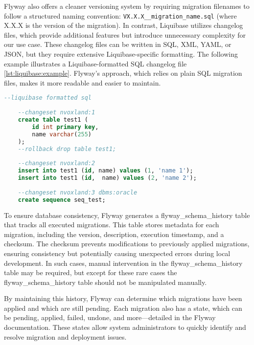 Flyway also offers a cleaner versioning system by requiring migration filenames to follow a structured naming convention: \texttt{VX.X.X\_\_migration\_name.sql} (where X.X.X is the version of the migration). In contrast, Liquibase utilizes changelog files, which provide additional features but introduce unnecessary complexity for our use case. These changelog files can be written in SQL, XML, YAML, or JSON, but they require extensive Liquibase-specific formatting. The following example illustrates a Liquibase-formatted SQL changelog file \ref{lst:liquibase:example}. Flyway's approach, which relies on plain SQL migration files, makes it more readable and easier to maintain.

\begin{lstlisting}[language=Sql,caption=Liquibase example changelog,label=lst:liquibase:example]
    --liquibase formatted sql
    
    --changeset nvoxland:1
    create table test1 (  
        id int primary key,
        name varchar(255)  
    );  
    --rollback drop table test1; 
    
    --changeset nvoxland:2 
    insert into test1 (id, name) values (1, 'name 1');
    insert into test1 (id,  name) values (2, 'name 2');  
    
    --changeset nvoxland:3 dbms:oracle
    create sequence seq_test;
\end{lstlisting}
    
To ensure database consistency, Flyway generates a flyway\_schema\_history table that tracks all executed migrations. This table stores metadata for each migration, including the version, description, execution timestamp, and a checksum. The checksum prevents modifications to previously applied migrations, ensuring consistency but potentially causing unexpected errors during local development. In such cases, manual intervention in the flyway\_schema\_history table may be required, but except for these rare cases the flyway\_schema\_history table should not be manipulated manually.

By maintaining this history, Flyway can determine which migrations have been applied and which are still pending. Each migration also has a state, which can be pending, applied, failed, undone, and more—detailed in the Flyway documentation. These states allow system administrators to quickly identify and resolve migration and deployment issues.

